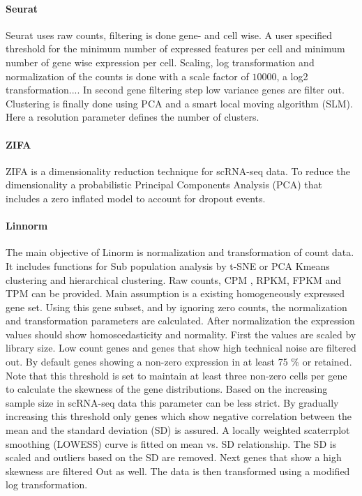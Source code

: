\documentclass[11pt, a4paper]{article}\usepackage[]{graphicx}\usepackage[]{color}
\begin{document}
\paragraph{Seurat}
Seurat uses raw counts, filtering is done gene- and cell wise. A user specified threshold for the minimum number of expressed features per cell and minimum number of gene wise expression per cell. Scaling, log transformation and normalization of the counts is done with a scale factor of $10000$, a log2 transformation.... In second gene filtering step low variance genes are filter out. Clustering is finally done using PCA and a smart local moving algorithm (SLM). Here a resolution parameter defines the number of clusters.

\paragraph{ZIFA}
ZIFA is a dimensionality reduction technique for scRNA-seq data. To reduce the dimensionality a probabilistic Principal Components Analysis (PCA) that includes a 
zero inflated model to account for dropout events. 
\paragraph{Linnorm }
The main objective of Linorm is normalization and transformation of count data\citep{yip2017linnorm}. It includes functions for Sub population analysis by t-SNE or PCA Kmeans clustering and hierarchical clustering. Raw counts, CPM , RPKM, FPKM and TPM can be provided. 
Main assumption is a existing homogeneously expressed gene set. Using this gene subset, and by ignoring zero counts,  the normalization and transformation parameters are calculated. After normalization the expression values should show homoscedasticity and normality. First the values are scaled by library size. Low count genes  and genes that show high technical noise are filtered out. By default genes showing a non-zero expression in at least 75 \% or retained. Note that this threshold is set to maintain at least three non-zero cells per gene to calculate the skewness of the gene distributions. Based on the increasing sample size in scRNA-seq data this parameter can be less strict. By gradually increasing this threshold only genes which show  negative correlation between the mean and the standard deviation (SD) is assured. 
A locally weighted scaterrplot smoothing (LOWESS) curve is fitted on mean vs. SD relationship. The SD is scaled and outliers based on the SD are removed. Next genes that show a high skewness are filtered Out as well. The data is then transformed using a modified log transformation.
\end{document}
